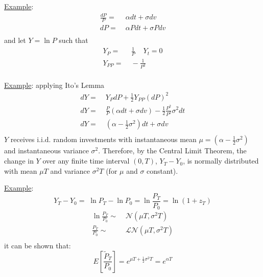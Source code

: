 \documentclass[
14pt,notheorems,hyperref={pdfauthor=whatever}
]{beamer}
\begin{document}
\begin{frame}
\underline{Example}:
\begin{align*}
    \frac{dP}{P} =&\; \alpha dt + \sigma dv\\
    dP =&\; \alpha P dt + \sigma P dv\\
\end{align*}
and let $Y = \ln{P}$ such that
\begin{align*}
    Y_P =&\; \frac{1}{P} \;\;\;\; Y_t=0\\
    Y_{PP} =&\; -\frac{1}{P^2}\\
\end{align*}
\end{frame}

\begin{frame}
\underline{Example}: applying Ito's Lemma
\begin{align*}
    dY =&\; Y_P dP + \frac{1}{2} Y_{PP} (dP)^2\\
    dY =&\; \frac{P}{P}(\alpha dt + \sigma dv)-\frac{1}{2} \frac{P^2}{P^2} \sigma^2 dt\\
    dY =&\; (\alpha - \frac{1}{2}\sigma^2)dt + \sigma dv\\
\end{align*}
$Y$ receives i.i.d. random investments with instantaneous mean $\mu = (\alpha - \frac{1}{2}\sigma^2)$ and instantaneous variance $\sigma^2$.
Therefore, by the Central Limit Theorem, the change in $Y$ over any finite time interval $(0,T)$, $Y_T-Y_0$, is normally distributed with mean $\mu T$ and variance $\sigma^2 T$ (for $\mu$ and $\sigma$ constant).
\end{frame}

\begin{frame}
\underline{Example}: 
\[Y_T - Y_0 = \; \ln{P_T} - \ln{P_0} = \ln{\frac{P_T}{P_0}} = \ln{(1+z_T)}\]
\begin{align*}
    \ln{\frac{P_T}{P_0}} \sim &\; \mathcal{N}(\mu T, \sigma^2 T)\\
    \frac{P_T}{P_0} \sim &\; \mathcal{LN}(\mu T, \sigma^2 T)\\
\end{align*}
it can be shown that:
\[E[\frac{\tilde P_T}{P_0}]=e^{\mu T +\frac{1}{2}\sigma^2T} = e^{\alpha T}\]
\end{frame}
\end{document}
